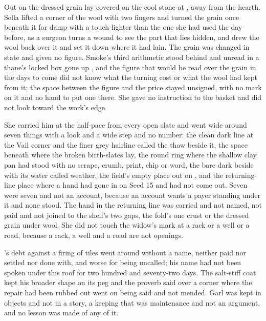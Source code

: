 \scenebreak

Out on  the dressed grain lay covered on the cool stone at , away from the hearth. Sella lifted a corner of the wool with two fingers and turned the grain once beneath it for damp with a touch lighter than the one she had used the day before, as a surgeon turns a wound to see the part that lies hidden, and drew the wool back over it and set it down where it had lain. The grain was changed in state and given no figure. Smoke's third arithmetic stood behind and unread in a thane's locked box gone up , and the figure that would be read over the grain in the days to come did not know what the turning cost or what the wool had kept from it; the space between the figure and the price stayed unsigned, with no mark on it and no hand to put one there. She gave no instruction to the basket and did not look toward the work's edge.

She carried him at the half-pace from every open slate and went wide around seven things with a look and a wide step and no number: the clean dark line at the Vail corner and the finer grey hairline called the thaw beside it, the space beneath  where the broken birth-slates lay, the round ring where the shallow clay pan had stood with no scrape, crumb, print, chip or word, the bare dark  beside  with its water called weather, the field's empty place out on , and the returning-line place where a hand had gone in on Seed 15 and had not come out. Seven were seven and not an account, because an account wants a payer standing under it and none stood. The hand in the returning line was carried and not named, not paid and not joined to the shelf's two gaps, the fold's one crust or the dressed grain under wool. She did not touch the widow's mark at a rack or a well or a road, because a rack, a well and a road are not openings.

's debt against a firing of tiles went around without a name, neither paid nor settled nor done with, and worse for being uncalled; his name had not been spoken under this roof for two hundred and seventy-two days. The salt-stiff coat kept his broader shape on its peg and the proverb said over a corner where the repair had been rubbed out went on being said and not mended. Garl was kept in objects and not in a story, a keeping that was maintenance and not an argument, and no lesson was made of any of it.

